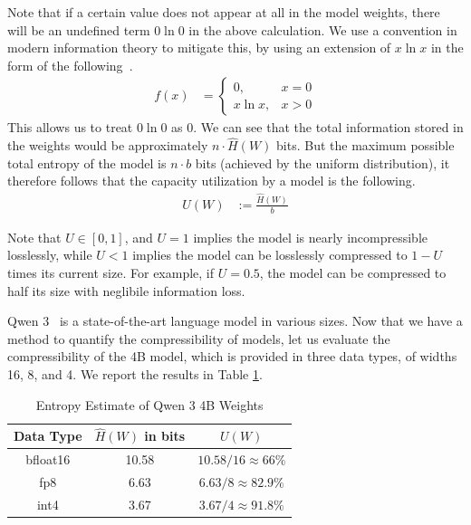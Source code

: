 \documentclass[../main.tex]{subfiles}
\begin{document}
Note that if a certain value does not appear at all in the model weights, there will be an undefined term $0\ln 0$ in the above calculation. We use a convention in modern information theory to mitigate this, by using an extension of $x\ln x$ in the form of the following~\cite[eq. 1.1.2]{ebanks1998characterizations}.
\begin{align} \label{eq:math_hack}
    f(x) &= \begin{cases}
        0, & x = 0 \\
        x\ln x, & x > 0
    \end{cases}
\end{align}
This allows us to treat $0\ln 0$ as $0$. We can see that the total information stored in the weights would be approximately $n \cdot \hat{H}(W)$ bits. But the maximum possible total entropy of the model is $n\cdot b$ bits (achieved by the uniform distribution), it therefore follows that the capacity utilization by a model is the following.
\begin{align}
U(W) &:= \frac{\hat{H}(W)}{b}
\end{align}

Note that $U \in [0, 1]$, and $U = 1$ implies the model is nearly incompressible losslessly, while $U < 1$ implies the model can be losslessly compressed to $1 - U$ times its current size. For example, if $U = 0.5$, the model can be compressed to half its size with neglibile information loss.

Qwen 3~\cite{yangQwen3TechnicalReport2025b} is a state-of-the-art language model in various sizes. Now that we have a method to quantify the compressibility of models, let us evaluate the compressibility of the 4B model, which is provided in three data types, of widths 16, 8, and 4. We report the results in Table \ref{tab:qwen3_entropy}.

\begin{table}[H]
\centering
\caption{Entropy Estimate of Qwen 3 4B Weights}
\label{tab:qwen3_entropy}
\begin{tabular}{|c|c|c|}
 \hline
    Data Type & $\hat{H}(W)$ in bits & $U(W)$ \\ \hline
    bfloat16 & 10.58 & $10.58/16\approx66\%$ \\ \hline
    fp8 & 6.63 &  $6.63/8\approx82.9\%$ \\ \hline
    int4 & 3.67 & $3.67/4\approx91.8\%$ \\ \hline
\end{tabular}
\end{table}
\end{document}
